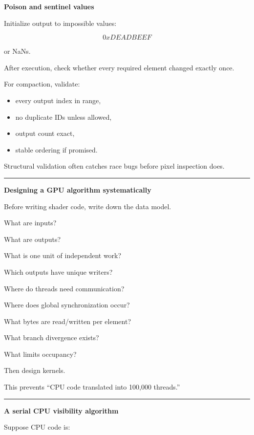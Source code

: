 \textbf{Poison and sentinel values}

Initialize output to impossible values:

\[
0xDEADBEEF
\]

or NaNs.

After execution, check whether every required element changed exactly once.

For compaction, validate:

\begin{itemize}
\tightlist
\item
  every output index in range,
\item
  no duplicate IDs unless allowed,
\item
  output count exact,
\item
  stable ordering if promised.
\end{itemize}

Structural validation often catches race bugs before pixel inspection does.

\begin{center}\rule{0.5\linewidth}{0.5pt}\end{center}

\textbf{Designing a GPU algorithm systematically}

Before writing shader code, write down the data model.

What are inputs?

What are outputs?

What is one unit of independent work?

Which outputs have unique writers?

Where do threads need communication?

Where does global synchronization occur?

What bytes are read/written per element?

What branch divergence exists?

What limits occupancy?

Then design kernels.

This prevents ``CPU code translated into 100,000 threads.''

\begin{center}\rule{0.5\linewidth}{0.5pt}\end{center}

\textbf{A serial CPU visibility algorithm}

Suppose CPU code is:

